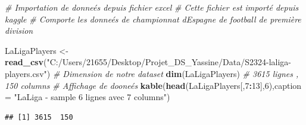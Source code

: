 \documentclass[
  6pt,
]{article}
\newenvironment{Shaded}{\begin{snugshade}}{\end{snugshade}}
\newcommand{\AttributeTok}[1]{\textcolor[rgb]{0.13,0.29,0.53}{#1}}
\newcommand{\CommentTok}[1]{\textcolor[rgb]{0.56,0.35,0.01}{\textit{#1}}}
\newcommand{\DecValTok}[1]{\textcolor[rgb]{0.00,0.00,0.81}{#1}}
\newcommand{\FunctionTok}[1]{\textcolor[rgb]{0.13,0.29,0.53}{\textbf{#1}}}
\newcommand{\NormalTok}[1]{#1}
\newcommand{\OtherTok}[1]{\textcolor[rgb]{0.56,0.35,0.01}{#1}}
\newcommand{\SpecialCharTok}[1]{\textcolor[rgb]{0.81,0.36,0.00}{\textbf{#1}}}
\newcommand{\StringTok}[1]{\textcolor[rgb]{0.31,0.60,0.02}{#1}}
\begin{document}
\begin{Shaded}
\begin{Highlighting}[]
\CommentTok{\# Importation de donneés depuis fichier excel }
\CommentTok{\# Cette fichier est importé depuis kaggle}
\CommentTok{\# Comporte les donneés de championnat d\textquotesingle{}Espagne de football de première division}

\NormalTok{LaLigaPlayers }\OtherTok{\textless{}{-}} \FunctionTok{read\_csv}\NormalTok{(}\StringTok{"C:/Users/21655/Desktop/Projet\_DS\_Yassine/Data/S2324{-}laliga{-}players.csv"}\NormalTok{)}
\CommentTok{\# Dimension de notre dataset }
\FunctionTok{dim}\NormalTok{(LaLigaPlayers) }\CommentTok{\# 3615 lignes , 150 columns }
\CommentTok{\# Affichage de dooneés }
\FunctionTok{kable}\NormalTok{(}\FunctionTok{head}\NormalTok{(LaLigaPlayers[,}\DecValTok{7}\SpecialCharTok{:}\DecValTok{13}\NormalTok{],}\DecValTok{6}\NormalTok{),}\AttributeTok{caption =} \StringTok{"LaLiga {-} sample 6 lignes avec 7 columns"}\NormalTok{)}
\end{Highlighting}
\end{Shaded}

\begin{verbatim}
## [1] 3615  150
\end{verbatim}
\end{document}
